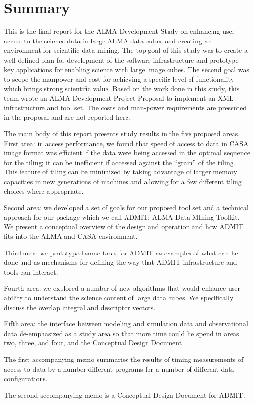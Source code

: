 \section{Summary}

This is the final report for the ALMA Development Study on enhancing
user access to the science data in large ALMA data cubes and
creating an environment for scientific data mining. The top
goal of this study was to create a well-defined plan for
development of the software infrastructure and prototype 
key applications for enabling science with large image cubes.
The second goal was to scope the manpower and cost for achieving
a specific level of functionality which brings strong scientific
value. Based on the work done in this study, this team wrote
an ALMA Development Project Proposal to implement an XML 
infrastructure and tool set. The costs and man-power requirements
are presented in the proposal and are not reported here.

The main body of this report presents study results in the
five proposed areas. First area: in access performance, we found
that speed of access to data in CASA image format was efficient
if the data were being accessed in the optimal sequence for the
tiling; it can be inefficient if accessed against the ``grain''
of the tiling. This feature of tiling can be minimized by taking
advantage of larger memory capacities in new generations of machines
and allowing for a few different tiling choices where appropriate.

Second area: we developed a set of goals for our proposed tool set
and a technical approach for our package which we call ADMIT:
ALMA Data MIning Toolkit. We present a conceptual overview of the
design and operation and how ADMIT fits into the ALMA and CASA
environment.

Third area: we prototyped some tools for ADMIT as examples of what
can be done and as mechanisms for defining the way that ADMIT infrastructure
and tools can interact.

Fourth area: we explored a number of new algorithms that would enhance
user ability to understand the science content of large data cubes. 
We specifically discuss the overlap integral and descriptor vectors.

Fifth area: the interface between modeling and simulation data and
observational data de-emphasized as a study area so that more time
could be spend in areas two, three, and four, and the Conceptual
Design Document

The first accompanying memo summaries the results of timing measurements
of access to data by a number different programs for a number of
different data configurations. 

The second accompanying memo is a Conceptual Design Document for ADMIT.
